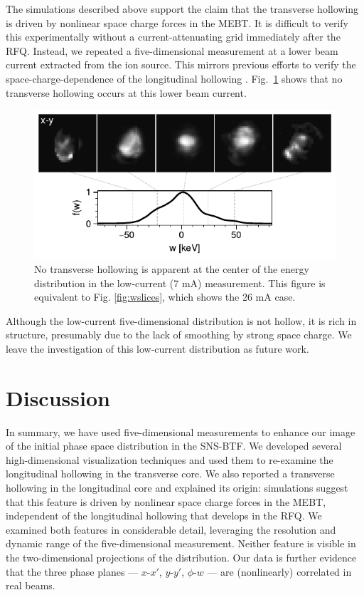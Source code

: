 \documentclass[%
 reprint,
nofootinbib,
 amsmath,amssymb,
 aps,
prstab,
]{revtex4-2}
\begin{document}
The simulations described above support the claim that the transverse hollowing is driven by nonlinear space charge forces in the MEBT. It is difficult to verify this experimentally without a current-attenuating grid immediately after the RFQ. Instead, we repeated a five-dimensional measurement at a lower beam current extracted from the ion source. This mirrors previous efforts to verify the space-charge-dependence of the longitudinal hollowing \cite{Cathey2018}. Fig.~\ref{fig:wslices_low_current} shows that no transverse hollowing occurs at this lower beam current.
%
\begin{figure}
    \centering
    \includegraphics[width=\columnwidth]{fig_xyw_7mA.pdf}
    \caption{No transverse hollowing is apparent at the center of the energy distribution in the low-current (7 mA) measurement. This figure is equivalent to Fig. \ref{fig:wslices}, which shows the 26 mA case.}
    \label{fig:wslices_low_current}
\end{figure}
%
Although the low-current five-dimensional distribution is not hollow, it is rich in structure, presumably due to the lack of smoothing by strong space charge. We leave the investigation of this low-current distribution as future work.


\section{Discussion}\label{sec:discussion}

In summary, we have used five-dimensional measurements to enhance our image of the initial phase space distribution in the SNS-BTF. We developed several high-dimensional visualization techniques and used them to re-examine the longitudinal hollowing in the transverse core. We also reported a transverse hollowing in the longitudinal core and explained its origin: simulations suggest that this feature is driven by nonlinear space charge forces in the MEBT, independent of the longitudinal hollowing that develops in the RFQ. We examined both features in considerable detail, leveraging the resolution and dynamic range of the five-dimensional measurement. Neither feature is visible in the two-dimensional projections of the distribution. Our data is further evidence that the three phase planes --- $x$-$x'$, $y$-$y'$, $\phi$-$w$ --- are (nonlinearly) correlated in real beams.
\end{document}
